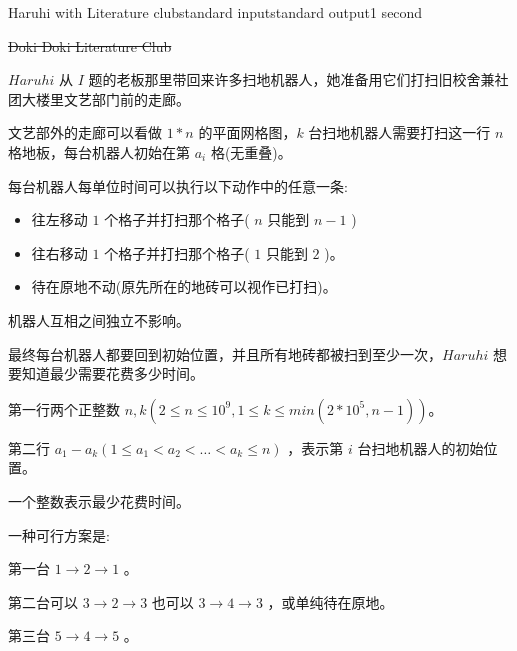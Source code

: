 \begin{problem}{Haruhi with Literature club}{standard input}{standard output}{1 second}

\sout{Doki Doki Literature Club}

$Haruhi$ 从 $I$ 题的老板那里带回来许多扫地机器人，她准备用它们打扫旧校舍兼社团大楼里文艺部门前的走廊。

文艺部外的走廊可以看做 $1*n$ 的平面网格图，$k$ 台扫地机器人需要打扫这一行 $n$ 格地板，每台机器人初始在第 $a_i$ 格(无重叠)。

每台机器人每单位时间可以执行以下动作中的任意一条:
\begin{itemize}
\item 往左移动 $1$ 个格子并打扫那个格子( $n$ 只能到 $n-1$ )
\item 往右移动 $1$ 个格子并打扫那个格子( $1$ 只能到 $2$ )。
\item 待在原地不动(原先所在的地砖可以视作已打扫)。
\end{itemize}

机器人互相之间独立不影响。

最终每台机器人都要回到初始位置，并且所有地砖都被扫到至少一次，$Haruhi$ 想要知道最少需要花费多少时间。

\InputFile

第一行两个正整数 $n,k(2 \leq n \leq 10^9,1 \leq k \leq min(2*10^5,n-1))$。

第二行 $a_1-a_k(1 \leq a_1 \lt a_2 \lt \dots \lt a_k \leq n)$ ，表示第 $i$ 台扫地机器人的初始位置。

\OutputFile

一个整数表示最少花费时间。

\Example
\begin{example}
%
\end{example}

\Note

一种可行方案是:

第一台 $1 \to 2 \to 1$ 。

第二台可以 $3 \to 2 \to 3$ 也可以 $3 \to 4 \to 3$ ，或单纯待在原地。

第三台 $5 \to 4 \to 5$ 。

\end{problem}
